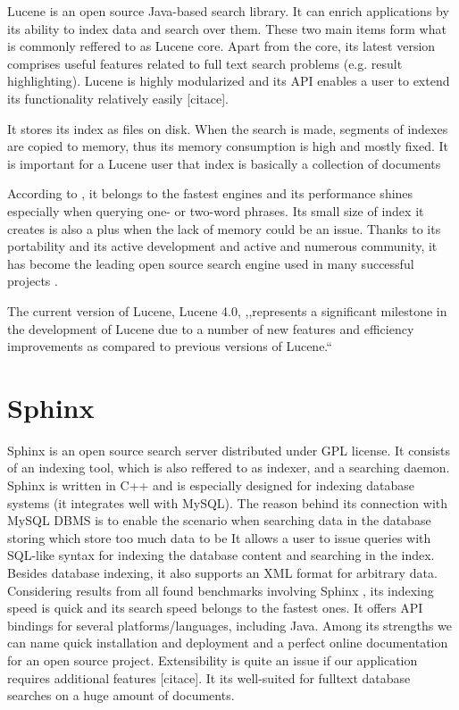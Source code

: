 Lucene \cite{LuceneHome} is an open source Java-based search
library. It can enrich applications by its ability to index data and
search over them. These two main items form what is commonly reffered
to as Lucene core. Apart from the core, its latest version comprises
useful features related to full text search problems (e.g. result
highlighting). Lucene is highly modularized and its API enables a
user to extend its functionality relatively easily {[}citace{]}. 

It stores its index as files on disk. When the search is made, segments
of indexes are copied to memory, thus its memory consumption is high
and mostly fixed. It is important for a Lucene user that index is
basically a collection of documents 

According to \cite{MiddletonBaeza,ComparisonLuceneIndri}, it
belongs to the fastest engines and its performance shines especially
when querying one- or two-word phrases. Its small size of index it
creates is also a plus when the lack of memory could be an issue.
Thanks to its portability and its active development and active and
numerous community, it has become the leading open source search engine
used in many successful projects \cite{LuceneWhoUses}.

The current version of Lucene, Lucene 4.0, ,,represents a significant
milestone in the development of Lucene due to a number of new features
and efficiency improvements as compared to previous versions of Lucene.``
\cite{ApacheLucene4}


\section{Sphinx}

Sphinx \cite{SphinxHome} is an open source search server distributed
under GPL license. 
It consists of an indexing tool, which is also reffered to as indexer, and a searching daemon. 
Sphinx is written in C++ and is especially designed for indexing database systems (it integrates well with MySQL).
The reason behind its connection with MySQL DBMS is to enable the scenario when searching data in the database  storing which store too much data to be 
It allows a user to issue queries with SQL-like syntax for indexing the database content and searching in the index.
Besides database indexing, it also supports an XML format for arbitrary data. 
Considering results from all found benchmarks involving Sphinx \cite{IndriHome,MiddletonBaeza,BenchmarkLuceneSphinxNewer,BenchmarkMysqlLuceneSphinx}, its indexing speed is quick and its search speed belongs to the fastest ones. 
It offers API bindings for several platforms/languages, including
Java. 
Among its strengths we can name quick installation and deployment
and a perfect online documentation for an open source project. 
Extensibility is quite an issue if our application requires additional features
{[}citace{]}. 
It its well-suited for fulltext database searches on
a huge amount of documents.


